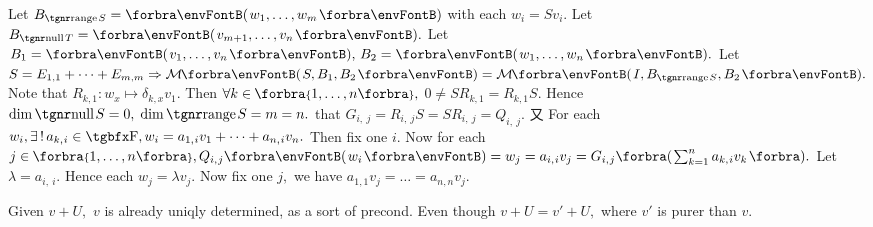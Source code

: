 Let $B_{\range S}=\Par{w_1,\dots,w_m}$ with each $w_i=Sv_i.$\parSol{}
Let $B_{\null T}=\Par{v_{m+1},\dots,v_n}.$ Let $B_1=\Par{v_1,\dots,v_n},\,B_2=\Par{w_1,\dots,w_n}.$\parSol{}
{\vspace{2pt}Let {$S=E_{1,1}+\dots+E_{m,m}\Rightarrow \Mt{S,B_1,B_2}=\Mt{I,B_{\range S},B_2}.$} Note that $R_{k,1}:w_x\mapsto\delta_{k,x}v_1.$}\parSol{}
{\vspace{2pt}Then $\forall k\in\;\!\!\Bra{1,\dots,n},$ {\FontLarge$0\neq SR_{k,1}=R_{k,1}S.$} Hence $\dim\null S=0,\;\dim\range S=m=n.$}\parSol{}
\vspace{2pt}\NOTICE that {\FontLarge$G_{i,\:\!j}=R_{i,\:\!j}S=SR_{i,\:\!j}=Q_{i,\:\!j}$}. 又 For each $w_i,\exists\,!\,a_{k,\:\!i}\in\Fbb,w_i=a_{1,\:\!i}v_1+\dots+a_{n,\:\!i}v_n.$\parSol{}
Then fix one $i.$ Now for each $j\in\;\!\!\Bra{1,\dots,n},Q_{i,\:\!j}\Par{w_i}=w_j=a_{i,\:\!i}v_j=G_{i,\:\!j}\BigBigPar{{\sum_{k=1}^na_{k,\:\!i} v_k}}.$\parSol{}
Let $\lambda=a_{i,\:\!i}.$ Hence each $w_j=\lambda v_j.$ Now fix one $j,$ we have $a_{1,1}v_j=\dots=a_{n,n}v_j.$\PfEnd
\SepLine

%
\ChEnd
\pagebreak


\vspace{4pt}

\BulletPointX{}\;\;Given $v+U,$ $v$ is already uniqly determined, as a sort of precond.\TextB{}
Even though $v+U=v'+U,$ where $v'$ is {\tgsl purer} than $v.$
\SepLine

\BulletPointX\NoteForSmall{[3.85]}\;\;
\SepLine

